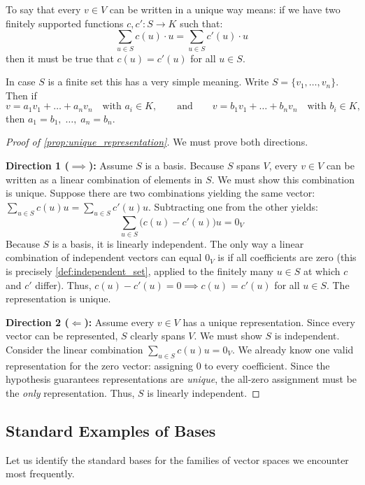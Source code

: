 To say that every $v \in V$ can be written in a unique way means: if we have two finitely supported functions $c, c': S \to K$ such that:
\[
\sum_{u \in S} c(u) \cdot u = \sum_{u \in S} c'(u) \cdot u
\]
then it must be true that $c(u) = c'(u)$ for all $u \in S$.

In case $S$ is a finite set this has a very simple meaning. Write $S = \{v_1, \dots, v_n\}$. Then if
\[
v = a_1 v_1 + \dots + a_n v_n \quad \text{with } a_i \in K, \qquad \text{and} \qquad v = b_1 v_1 + \dots + b_n v_n \quad \text{with } b_i \in K,
\]
then $a_1 = b_1, \; \dots, \; a_n = b_n$.

\begin{proof}[Proof of \cref{prop:unique_representation}]
We must prove both directions.

\textbf{Direction 1 ($\implies$):} Assume $S$ is a basis. Because $S$ spans $V$, every $v \in V$ can be written as a linear combination of elements in $S$. We must show this combination is unique. 
Suppose there are two combinations yielding the same vector: $\sum_{u \in S} c(u) u = \sum_{u \in S} c'(u) u$. 
Subtracting one from the other yields:
\[
\sum_{u \in S} \big(c(u) - c'(u)\big) u = 0_V
\]
Because $S$ is a basis, it is linearly independent. The only way a linear combination of independent vectors can equal $0_V$ is if all coefficients are zero (this is precisely \cref{def:independent_set}, applied to the finitely many $u \in S$ at which $c$ and $c'$ differ). Thus, $c(u) - c'(u) = 0 \implies c(u) = c'(u)$ for all $u \in S$. The representation is unique.

\textbf{Direction 2 ($\Longleftarrow$):} Assume every $v \in V$ has a unique representation. Since every vector can be represented, $S$ clearly spans $V$. We must show $S$ is independent. 
Consider the linear combination $\sum_{u \in S} c(u) u = 0_V$. We already know one valid representation for the zero vector: assigning $0$ to every coefficient. Since the hypothesis guarantees representations are \textit{unique}, the all-zero assignment must be the \textit{only} representation. Thus, $S$ is linearly independent. 
\end{proof}

\subsection{Standard Examples of Bases}

Let us identify the standard bases for the families of vector spaces we encounter most frequently.


